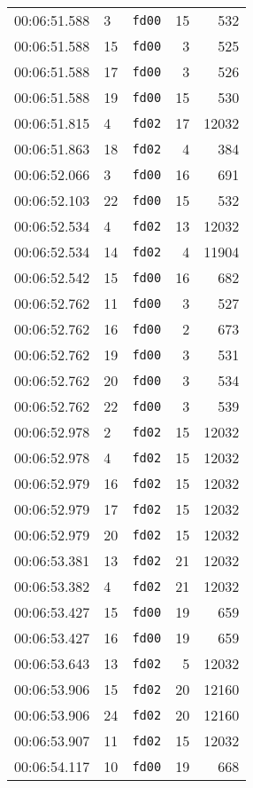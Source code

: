 \documentclass{article}
\begin{document}
\begin{longtable}{lllrr}
00:06:51.588 & 3 & \texttt{fd00} & 15 & 532 \\
00:06:51.588 & 15 & \texttt{fd00} & 3 & 525 \\
00:06:51.588 & 17 & \texttt{fd00} & 3 & 526 \\
00:06:51.588 & 19 & \texttt{fd00} & 15 & 530 \\
00:06:51.815 & 4 & \texttt{fd02} & 17 & 12032 \\
00:06:51.863 & 18 & \texttt{fd02} & 4 & 384 \\
00:06:52.066 & 3 & \texttt{fd00} & 16 & 691 \\
00:06:52.103 & 22 & \texttt{fd00} & 15 & 532 \\
00:06:52.534 & 4 & \texttt{fd02} & 13 & 12032 \\
00:06:52.534 & 14 & \texttt{fd02} & 4 & 11904 \\
00:06:52.542 & 15 & \texttt{fd00} & 16 & 682 \\
00:06:52.762 & 11 & \texttt{fd00} & 3 & 527 \\
00:06:52.762 & 16 & \texttt{fd00} & 2 & 673 \\
00:06:52.762 & 19 & \texttt{fd00} & 3 & 531 \\
00:06:52.762 & 20 & \texttt{fd00} & 3 & 534 \\
00:06:52.762 & 22 & \texttt{fd00} & 3 & 539 \\
00:06:52.978 & 2 & \texttt{fd02} & 15 & 12032 \\
00:06:52.978 & 4 & \texttt{fd02} & 15 & 12032 \\
00:06:52.979 & 16 & \texttt{fd02} & 15 & 12032 \\
00:06:52.979 & 17 & \texttt{fd02} & 15 & 12032 \\
00:06:52.979 & 20 & \texttt{fd02} & 15 & 12032 \\
00:06:53.381 & 13 & \texttt{fd02} & 21 & 12032 \\
00:06:53.382 & 4 & \texttt{fd02} & 21 & 12032 \\
00:06:53.427 & 15 & \texttt{fd00} & 19 & 659 \\
00:06:53.427 & 16 & \texttt{fd00} & 19 & 659 \\
00:06:53.643 & 13 & \texttt{fd02} & 5 & 12032 \\
00:06:53.906 & 15 & \texttt{fd02} & 20 & 12160 \\
00:06:53.906 & 24 & \texttt{fd02} & 20 & 12160 \\
00:06:53.907 & 11 & \texttt{fd02} & 15 & 12032 \\
00:06:54.117 & 10 & \texttt{fd00} & 19 & 668 \\

\end{longtable}
\end{document}
